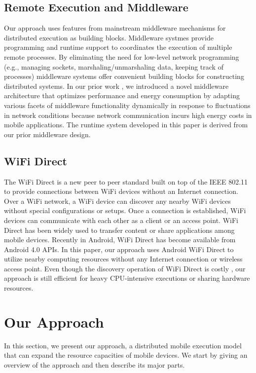 \documentclass{sig-alternate}[10pt]
\begin{document}
\begin{CCSXML}
\subsection{Remote Execution and Middleware}
Our approach uses features from mainstream middleware mechanisms for distributed execution as building blocks. Middleware systmes provide programming and runtime support to coordinates the execution of multiple remote processes. By eliminating the need for low-level network programming (e.g., managing sockets, marshaling/unmarshaling data, keeping track of processes) middleware systems offer convenient building blocks for constructing distributed systems. In our prior work \cite{kwon+:mobicase14-middleware}, we introduced a novel middleware architecture that optimizes performance and energy consumption by adapting various facets of middleware functionality dynamically in response to fluctuations in network conditions because network communication incurs high energy costs in mobile applications. The runtime system developed in this paper is derived from our prior middleware design.

\subsection{WiFi Direct}
The WiFi Direct \cite{alliance2010wi} is a new peer to peer standard built on top of the IEEE 802.11 to provide connections between WiFi devices without an Internet connection. Over a WiFi network, a WiFi device can discover any nearby WiFi devices without special configurations or setups. Once a connection is established, WiFi devices can communicate with each other as a client or an access point. WiFi Direct has been widely used to transfer content or share applications among mobile devices. Recently in Android, WiFi Direct has become available from Android 4.0 APIs. In this paper, our approach uses Android WiFi Direct \cite{wifi:p2p} to utilize nearby computing resources without any Internet connection or wireless access point. Even though the discovery operation of WiFi Direct is costly \cite{trifunovic2013slicing}, our approach is still efficient for heavy CPU-intensive executions or sharing hardware resources. 



\section{Our Approach}
\label{sec:approach}
In this section, we present our approach, a distributed mobile execution model that can expand the resource capacities of mobile devices. We start by giving an overview of the approach and then describe its major parts.


\end{CCSXML}
\end{document}
